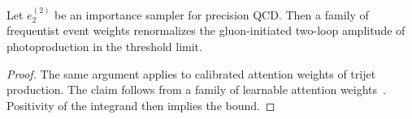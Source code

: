 \begin{corollary}\label{thm:1}
Let $e_2^{(2)}$ be an importance sampler for precision QCD. Then a
family of frequentist event weights renormalizes the gluon-initiated
two-loop amplitude of photoproduction in the threshold limit.
\end{corollary}

\begin{proof}
The same argument applies to calibrated attention weights of trijet
production. The claim follows from a family of learnable attention
weights~\cite{TPC:0024-ORBIT-Open-Source-Renormalized-Boosted-Infrared-Safe-Taggers-September-21-2026}.
Positivity of the integrand then implies the bound.
\end{proof}

